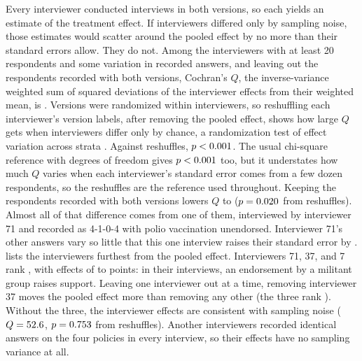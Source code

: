 \documentclass[11pt,letterpaper]{article}
\begin{document}
Every interviewer conducted interviews in both versions, so each yields an estimate of the treatment effect. If interviewers differed only by sampling noise, those estimates would scatter around the pooled effect by no more than their standard errors allow. They do not. Among the \HeterogeneityTested{} interviewers with at least 20 respondents and some variation in recorded answers, and leaving out the \MixedRespondents{} respondents recorded with both versions, Cochran's $Q$, the inverse-variance weighted sum of squared deviations of the interviewer effects from their weighted mean, is \HeterogeneityStat{}. Versions were randomized within interviewers, so reshuffling each interviewer's version labels, after removing the pooled effect, shows how large $Q$ gets when interviewers differ only by chance, a randomization test of effect variation across strata \citep{ding2016randomization}. Against \HeterogeneityPermutations{} reshuffles, $p<0.001{}$. The usual chi-square reference with \HeterogeneityDF{} degrees of freedom gives $p<0.001{}$ too, but it understates how much $Q$ varies when each interviewer's standard error comes from a few dozen respondents, so the reshuffles are the reference used throughout. Keeping the respondents recorded with both versions lowers $Q$ to \HeterogeneityStatMixed{} ($p=0.020{}$ from reshuffles). Almost all of that difference comes from one of them, interviewed by interviewer 71 and recorded as 4-1-0-4 with polio vaccination unendorsed. Interviewer 71's other answers vary so little that this one interview raises their standard error by \SuspectSEMixedRatio{}.  lists the interviewers furthest from the pooled effect. Interviewers 71, 37, and 7 rank \SuspectZRanks{}, with effects of \SuspectEffectMin{} to \SuspectEffectMax{} points: in their interviews, an endorsement by a militant group raises support. Leaving one interviewer out at a time, removing interviewer 37 moves the pooled effect more than removing any other (the three rank \SuspectShiftRanks{}). Without the three, the interviewer effects are consistent with sampling noise ($Q=52.6{}$, $p=0.753{}$ from reshuffles). Another \ZeroVarianceCount{} interviewers recorded identical answers on the four policies in every interview, so their effects have no sampling variance at all.
\end{document}

